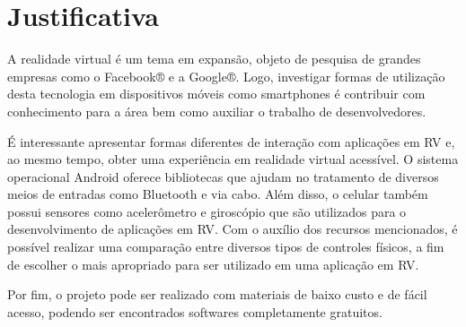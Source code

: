 \section{Justificativa}
\label{c.justificativa}

A realidade virtual é um tema em expansão, objeto de pesquisa de grandes empresas como o Facebook® e a Google®. Logo, investigar formas de utilização desta tecnologia em dispositivos móveis como smartphones é contribuir com conhecimento para a área bem como auxiliar o trabalho de desenvolvedores. 

É interessante apresentar formas diferentes de interação com aplicações em RV e, ao mesmo tempo, obter uma experiência em realidade virtual acessível. O sistema operacional Android oferece bibliotecas que ajudam no tratamento de diversos meios de entradas como Bluetooth e via cabo. Além disso, o celular também possui sensores como acelerômetro e giroscópio que são utilizados para o desenvolvimento de aplicações em RV. Com o auxílio dos recursos mencionados, é possível realizar uma comparação entre diversos tipos de controles físicos, a fim de escolher o mais apropriado para ser utilizado em uma aplicação em RV. 

Por fim, o projeto pode ser realizado com materiais de baixo custo e de fácil acesso, podendo ser encontrados softwares completamente gratuitos.




